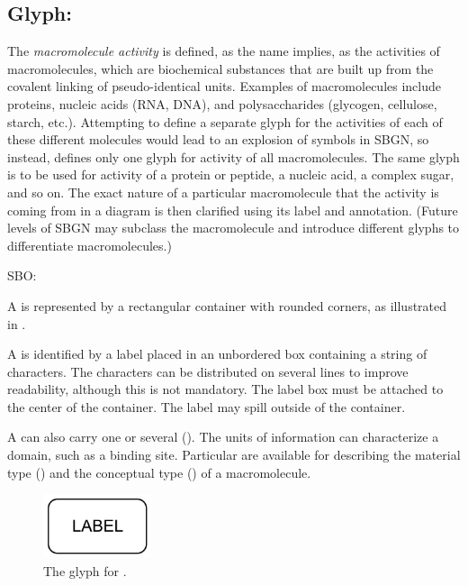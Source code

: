 \subsection{Glyph: }
\label{sec:af:macromoleculeActivity}

The \emph{macromolecule activity} is defined, as the name implies, as the activities of macromolecules, which are biochemical substances that are built up from the covalent linking of pseudo-identical units. Examples of macromolecules include proteins, nucleic acids (RNA, DNA), and polysaccharides (glycogen, cellulose, starch, etc.). Attempting to define a separate glyph for the activities of each of these different molecules would lead to an explosion of symbols in SBGN, so instead, \SBGNAFLone defines only one glyph for activity of all macromolecules. The same glyph is to be used for activity of a protein or peptide, a nucleic acid, a complex sugar, and so on. The exact nature of a particular macromolecule that the activity is coming from in a diagram is then clarified using its label and annotation. (Future levels of SBGN may subclass the macromolecule and introduce different glyphs to differentiate macromolecules.)

\begin{glyphDescription}

\glyphSboTerm SBO:

\glyphContainer A  is represented by a rectangular container with rounded corners, as illustrated in .

\glyphLabel A  is identified by a label placed in an unbordered box containing a string of characters.  The characters can be distributed on several lines to improve readability, although this is not mandatory.  The label box must be attached to the center of the container.  The label may spill outside of the container.

A  can also carry one or several  (). The units of information can characterize a domain, such as a binding site.  Particular  are available for describing the material type () and the conceptual type () of a macromolecule.

\end{glyphDescription}

\begin{figure}[H]
  \centering
  \includegraphics[width = 1.25in]{images/macromolecule-plain}
  \caption{The \AF glyph for .}
  \label{fig:af:macromolecule}
\end{figure}
